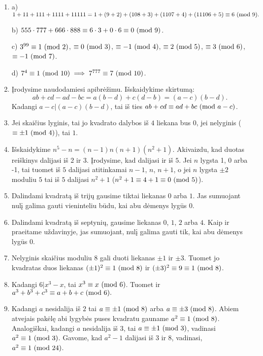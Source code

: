\begin{enumerate}
\item
    a) $1+11+111+1111+11111 = 1 + (9+2) + (108 + 3) + (1107 + 4) + (11106 +
    5) \equiv 6 \ (\text{mod } 9).$
    
    b) $555\cdot 777 + 666\cdot 888 \equiv 6\cdot 3 + 0\cdot 6 \equiv
    0\ (\text{mod } 9)$.
    
    c) $3^{99} \equiv 1 \ (\text{mod } 2)$, $\equiv 0 \ (\text{mod } 3)$, $\equiv -1 \ (\text{mod } 4)$,
    $\equiv 2 \ (\text{mod } 5)$, $\equiv 3\ (\text{mod } 6)$, $\equiv -1\ (\text{mod } 7)$.
    
    d) $7^4 \equiv 1 \ (\text{mod } 10) \implies 7^{777} \equiv 7 \ (\text{mod } 10)$.
\item
    Įrodysime naudodamiesi apibrėžimu. Išskaidykime skirtumą: $$ab + cd -
    ad - bc = a(b-d) + c(d-b) = (a-c)(b-d).$$ Kadangi $a-c|(a-c)(b-d)$,
    tai iš ties $ab+cd \equiv ad + bc \ (\text{mod } a-c)$.
\item
    Jei skaičius lyginis, tai jo kvadrato dalybos iš $4$ liekana bus $0$, jei
    nelyginis ($\equiv \pm1\ (\text{mod } 4)$), tai $1$.
\item
    Išskaidykime $n^5-n = (n-1)n(n+1)(n^2+1).$ Akivaizdu, kad duotas
    reiškinys dalijasi iš $2$ ir $3$. Įrodysime, kad dalijasi ir iš
    $5$. Jei $n$ lygsta 1, 0 arba -1, tai tuomet iš $5$ dalijasi
    atitinkamai $n-1$, $n$, $n+1$, o jei $n$ lygsta $\pm 2$ moduliu
    $5$ tai iš $5$ dalijasi $n^2 +1$ ($n^2 + 1\equiv 4 + 1 \equiv 0 \ (\text{mod } 5)$). 
\item
    Dalindami kvadratą iš trijų gausime tiktai liekanas $0$ arba $1$. Jas
    sumuojant nulį galima gauti vieninteliu būdu, kai abu dėmenys lygūs
    $0$.
\item
    Dalindami kvadratą iš septynių, gausime liekanas $0$, $1$, $2$ arba
    $4$. Kaip ir praeitame uždavinyje, jas sumuojant, nulį galima gauti
    tik, kai abu dėmenys lygūs $0$.
\item
    Nelyginis skaičius moduliu $8$ gali duoti liekanas $\pm 1$ ir
    $\pm 3$. Tuomet jo kvadratas duos liekanas $(\pm1)^2 \equiv 1 \ (\text{mod } 8)$ ir
    $(\pm 3)^2 \equiv 9 \equiv 1 \ (\text{mod } 8)$.
\item
    Kadangi $6|x^3-x$, tai $x^3\equiv x\ (\text{mod } 6)$. Tuomet ir $a^3 + b^3 + c^3
    \equiv a+b+c \ (\text{mod } 6).$
\item
    Kadangi $a$ nesidalija iš $2$ tai $a\equiv \pm1 \ (\text{mod } 8)$ arba $a\equiv
    \pm3 \ (\text{mod } 8)$. Abiem atvejais pakėlę abi lygybės puses kvadratu gauname
    $a^2 \equiv 1\ (\text{mod } 8)$. Analogiškai, kadangi $a$ nesidalija iš $3$, tai
    $a\equiv \pm1 \ (\text{mod } 3)$, vadinasi $a^2 \equiv 1 \ (\text{mod } 3)$. Gavome, kad
    $a^2-1$ dalijasi iš $3$ ir $8$, vadinasi, $a^2 \equiv 1 \ (\text{mod } 24)$.

\end{enumerate}
